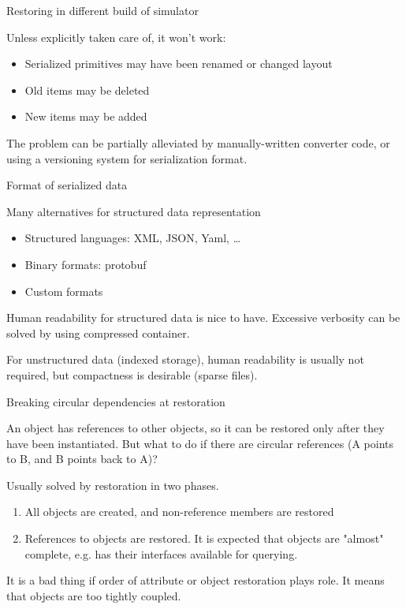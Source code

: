 \begin{frame}{Restoring in different build of simulator}

Unless explicitly taken care of, it won't work:

\begin{itemize}
    \item Serialized primitives may have been renamed or changed layout
    \item Old items may be deleted
    \item New items may be added
\end{itemize}

The problem can be partially alleviated by manually-written converter code, or
using a versioning system for serialization format.
\end{frame}

\begin{frame}{Format of serialized data}

Many alternatives for structured data representation
\begin{itemize}
    \item Structured languages: XML, JSON, Yaml, …
    \item Binary formats: protobuf
    \item Custom formats
\end{itemize}

Human readability for structured data is nice to have. Excessive verbosity can be solved by using compressed container.

For unstructured data (indexed storage), human readability is usually not required, but compactness is desirable (sparse files).

\end{frame}


\begin{frame}{Breaking circular dependencies at restoration}

An object has references to other objects, so it can be restored only after they have been instantiated.
But what to do if there are circular references (A points to B, and B points back to A)?

Usually solved by restoration in two phases.

\begin{enumerate}
    \item All objects are created, and non-reference members are restored
    \item References to objects are restored. It is expected that objects are "almost" complete, e.g. has their interfaces available for querying.
\end{enumerate}

It is a bad thing if order of attribute or object restoration plays role. It means that objects are too tightly coupled.

\end{frame}

